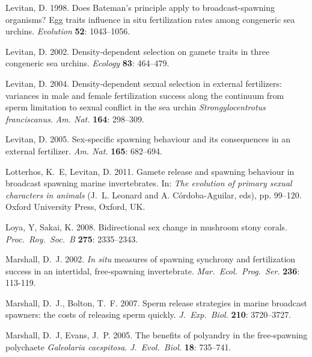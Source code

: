 \documentclass{article}
\begin{document}
\begin{thebibliography}{}
Levitan, D. 1998.
\newblock Does Bateman's principle apply to broadcast-spawning organisms? Egg traits influence in situ fertilization rates among congeneric sea urchins.
\newblock \textit{Evolution} \textbf{52}: 1043--1056.

Levitan, D. 2002.
\newblock Density-dependent selection on gamete traits in three congeneric sea urchins.
\newblock \textit{Ecology} \textbf{83}: 464--479.

Levitan, D. 2004.
\newblock Density-dependent sexual selection in external fertilizers: variances in male and female fertilization success along the continuum from sperm limitation to sexual conflict in the sea urchin \textit{Strongylocentrotus franciscanus}.
\newblock \textit{Am. Nat.} \textbf{164}: 298--309.

Levitan, D. 2005.
\newblock Sex-specific spawning behaviour and its consequences in an external fertilizer.
\newblock \textit{Am. Nat.} \textbf{165}: 682--694.

Lotterhos, K.~E, Levitan, D. 2011.
\newblock Gamete release and spawning behaviour in broadcast spawning marine invertebrates.
\newblock In: \textit{The evolution of primary sexual characters in animals} (J.~L. Leonard and A. C\'{o}rdoba-Aguilar, eds), pp. 99--120. Oxford University Press, Oxford, UK.

Loya, Y, Sakai, K. 2008.
\newblock Bidirectional sex change in mushroom stony corals.
\newblock \textit{Proc.~Roy.~Soc.~B} \textbf{275}: 2335--2343.

Marshall, D.~J. 2002.
\newblock \textit{In situ} measures of spawning synchrony and fertilization success in an intertidal, free-spawning invertebrate.
\newblock \textit{Mar.~Ecol.~Prog.~Ser.} \textbf{236}: 113-119.

Marshall, D.~J., Bolton, T.~F. 2007.
\newblock Sperm release strategies in marine broadcast spawners: the costs of releasing sperm quickly.
\newblock \textit{J.~Exp.~Biol.} \textbf{210}: 3720--3727.

Marshall, D.~J, Evans, J.~P. 2005.
\newblock The benefits of polyandry in the free-spawning polychaete \textit{Galeolaria caespitosa}.
\newblock \textit{J.~Evol.~Biol.} \textbf{18}: 735--741.


\end{thebibliography}
\end{document}
